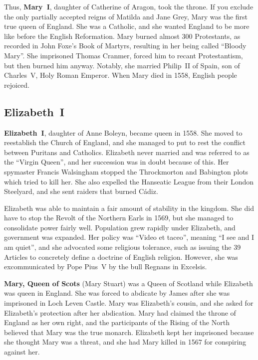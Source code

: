 Thus, \textbf{Mary~I}, daughter of Catherine of Aragon, took the throne.
If you exclude the only partially accepted reigns of Matilda and Jane Grey,
Mary was the first true queen of England.
She was a Catholic, and she wanted England to be more like before the English Reformation.
Mary burned almost 300 Protestants, as recorded in John Foxe's Book of Martyrs,
resulting in her being called ``Bloody Mary''.
She imprisoned Thomas Cranmer, forced him to recant Protestantism, but then burned him anyway.
Notably, she married Philip~II of Spain, son of Charles~V, Holy Roman Emperor.
When Mary died in 1558, English people rejoiced.

\subsection*{Elizabeth~I}

\textbf{Elizabeth~I}, daughter of Anne Boleyn, became queen in 1558.
She moved to reestablish the Church of England,
and she managed to put to rest the conflict between Puritans and Catholics.
Elizabeth never married and was referred to as the ``Virgin Queen'',
and her succession was in doubt because of this.
Her spymaster Francis Walsingham stopped the Throckmorton and Babington plots which tried to kill her.
She also expelled the Hanseatic League from their London Steelyard,
and she sent raiders that burned C\'a{}diz.

Elizabeth was able to maintain a fair amount of stability in the kingdom.
She did have to stop the Revolt of the Northern Earls in 1569,
but she managed to consolidate power fairly well.
Population grew rapidly under Elizabeth, and government was expanded.
Her policy was ``Video et taceo'', meaning ``I see and I am quiet'',
and she advocated some religious tolerance,
such as issuing the 39 Articles to concretely define a doctrine of English religion.
However, she was excommunicated by Pope Pius~V by the bull Regnans in Excelsis.

\textbf{Mary, Queen of Scots} (Mary Stuart) was a Queen of Scotland while Elizabeth was queen in England.
She was forced to abdicate by James after she was imprisoned in Loch Leven Castle.
Mary was Elizabeth's cousin, and she asked for Elizabeth's protection after her abdication.
Mary had claimed the throne of England as her own right,
and the participants of the Rising of the North believed that Mary was the true monarch.
Elizabeth kept her imprisoned because she thought Mary was a threat,
and she had Mary killed in 1567 for conspiring against her.

